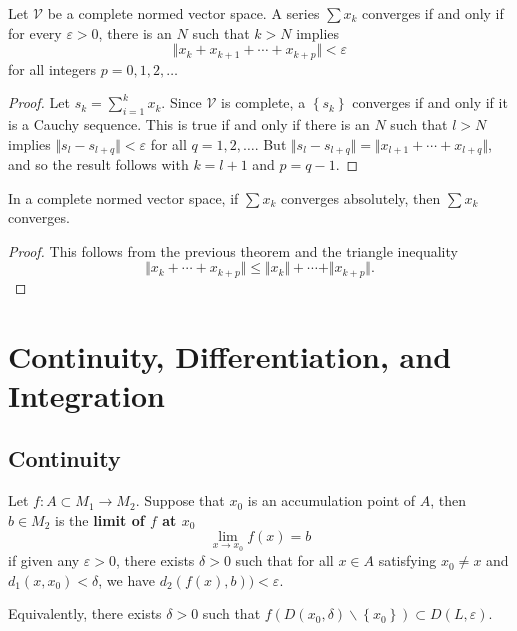 \documentclass[twoside,10pt]{report}
\begin{document}
\begin{thrm}[]
	Let $\mathcal{V}$ be a complete normed vector space. A series $\sum x_k $ converges if and only if for every $\varepsilon>0$, there is an $N$ such that $k  >N$ implies
	\[
	\Vert{x_k + x_{k+1}+\cdots+x_{k+p}}\Vert<\varepsilon
	\] 
	for all integers $p=0,1,2,\dots$
\end{thrm}
\begin{proof}
	Let $s_k = \sum_{i=1}^{k} x_k$. Since $\mathcal{V}$ is complete, a $\left\{ s_k \right\}$ converges if and only if it is a Cauchy sequence. This is true if and only if there is an $N$ such that $l > N$ implies $\Vert{s_l - s_{l+q}}\Vert <\varepsilon$ for all $q=1,2,\dots$. But $\Vert{s_l - s_{l+q}}\Vert=\Vert{x_{l+1}+\cdots+x_{l+q}}\Vert$, and so the result follows with $k=l+1$ and $p=q-1$.
\end{proof}

\begin{thrm}{}{}
In a complete normed vector space, if $\sum x_k$ converges absolutely, then $\sum x_k$ converges.
\end{thrm}
\begin{proof}
	This follows from the previous theorem and the triangle inequality
	 \[
	\Vert{x_k + \cdots + x_{k+p}}\Vert \leq \Vert{x_k}\Vert+\cdots+\Vert{x_{k+p}}\Vert.
	\] 
\end{proof}


\chapter{Continuity, Differentiation, and Integration}


\section{Continuity}

\begin{defn}[]
Let $f: A \subset M_1 \to M_2$. Suppose that $x_0$ is an accumulation point of $A$, then $b \in M_2$ is the \textbf{limit of $f$ at $x_0$} 
\[
	\lim_{x \to x_0} f(x) = b
\] 
if given any $\varepsilon>0$, there exists $\delta>0$ such that for all $x\in A$ satisfying $x_0 \neq x$ and $d_1(x,x_0)<\delta$, we have $d_2(f(x),b))<\varepsilon$.

Equivalently, there exists $\delta>0$ such that $f(D(x_0,\delta) \backslash \left\{ x_0 \right\}) \subset D(L,\varepsilon)$.
\end{defn}
\end{document}
